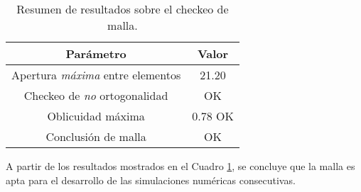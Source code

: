 \begin{table}[h!]
	\centering
	\begin{tabular}{|c|c|}
		\hline
		\textbf{Par\'ametro} & \textbf{Valor} \\ \hline
		Apertura \textit{m\'axima} entre elementos & 21.20 \\ \hline
		Checkeo de \textit{no} ortogonalidad & OK \\ \hline
		Oblicuidad m\'axima & 0.78 OK \\ \hline
		Conclusi\'on de malla & OK \\ \hline
	\end{tabular}
	\caption{Resumen de resultados sobre el checkeo de malla.}
	\label{check}
\end{table}

\noindent
\justify

A partir de los resultados mostrados en el Cuadro \ref{check}, se concluye que la malla es apta para el desarrollo de las simulaciones num\'ericas consecutivas.